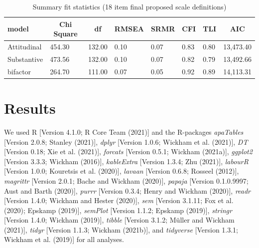 \documentclass[
  english,
  man]{apa7}
\begin{document}
\begin{table}[tbp]

\begin{center}
\begin{threeparttable}

\caption{\label{tab:fitmeasures}Summary fit statistics (18 item final proposed scale definitions)}

\begin{tabular}{llllllll}
\toprule
model & \multicolumn{1}{c}{Chi Square} & \multicolumn{1}{c}{df} & \multicolumn{1}{c}{RMSEA} & \multicolumn{1}{c}{SRMR} & \multicolumn{1}{c}{CFI} & \multicolumn{1}{c}{TLI} & \multicolumn{1}{c}{AIC}\\
\midrule
Attitudinal & 454.30 & 132.00 & 0.10 & 0.07 & 0.83 & 0.80 & 13,473.40\\
Substantive & 473.56 & 132.00 & 0.10 & 0.07 & 0.82 & 0.79 & 13,492.66\\
bifactor & 264.70 & 111.00 & 0.07 & 0.05 & 0.92 & 0.89 & 14,113.31\\
\bottomrule
\end{tabular}

\end{threeparttable}
\end{center}

\end{table}

\hypertarget{results}{%
\section{Results}\label{results}}

We used R {[}Version 4.1.0; R Core Team (2021){]} and the R-packages \emph{apaTables} {[}Version 2.0.8; Stanley (2021){]}, \emph{dplyr} {[}Version 1.0.6; Wickham et al. (2021){]}, \emph{DT} {[}Version 0.18; Xie et al. (2021){]}, \emph{forcats} {[}Version 0.5.1; Wickham (2021a){]}, \emph{ggplot2} {[}Version 3.3.3; Wickham (2016){]}, \emph{kableExtra} {[}Version 1.3.4; Zhu (2021){]}, \emph{labourR} {[}Version 1.0.0; Kouretsis et al. (2020){]}, \emph{lavaan} {[}Version 0.6.8; Rosseel (2012){]}, \emph{magrittr} {[}Version 2.0.1; Bache and Wickham (2020){]}, \emph{papaja} {[}Version 0.1.0.9997; Aust and Barth (2020){]}, \emph{purrr} {[}Version 0.3.4; Henry and Wickham (2020){]}, \emph{readr} {[}Version 1.4.0; Wickham and Hester (2020){]}, \emph{sem} {[}Version 3.1.11; Fox et al. (2020); Epskamp (2019){]}, \emph{semPlot} {[}Version 1.1.2; Epskamp (2019){]}, \emph{stringr} {[}Version 1.4.0; Wickham (2019){]}, \emph{tibble} {[}Version 3.1.2; Müller and Wickham (2021){]}, \emph{tidyr} {[}Version 1.1.3; Wickham (2021b){]}, and \emph{tidyverse} {[}Version 1.3.1; Wickham et al. (2019){]} for all analyses.
\end{document}
